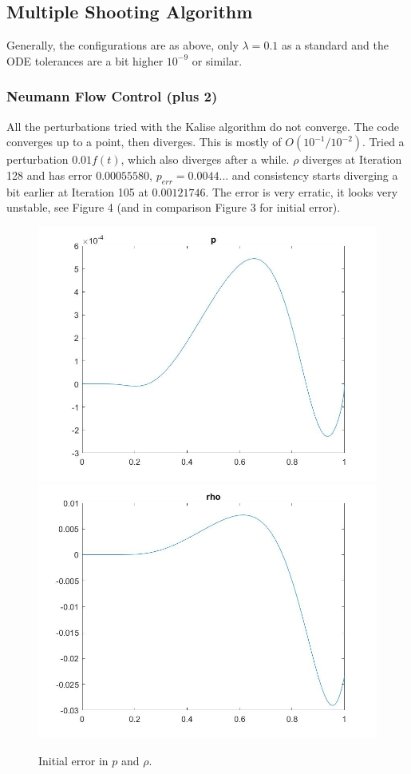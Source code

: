 \documentclass[11pt, a4paper]{article}
\theoremstyle{definition}
\begin{document}
\subsection*{Multiple Shooting Algorithm}
Generally, the configurations are as above, only $\lambda = 0.1$ as a standard and the ODE tolerances are a bit higher $10^{-9}$ or similar.
\subsubsection*{Neumann Flow Control (plus 2)}
All the perturbations tried with the Kalise algorithm do not converge. The code converges up to a point, then diverges. This is mostly of $O(10^{-1}/ 10^{-2})$. 
Tried a perturbation $0.01f(t)$, which also diverges after a while. $\rho$ diverges at Iteration 128 and has error $0.00055580$, $p_{err} = 0.0044...$ and consistency starts diverging a bit earlier at Iteration 105 at $0.00121746$.
The error is very erratic, it looks very unstable, see Figure 4 (and in comparison Figure 3 for initial error).
\begin{figure}[h]
	\includegraphics[scale=0.3]{Neumpinit.jpg}
	\includegraphics[scale=0.3]{Neumrhoinit.jpg}
	\caption{Initial error in $p$ and $\rho$.}
\end{figure} 
\end{document}
